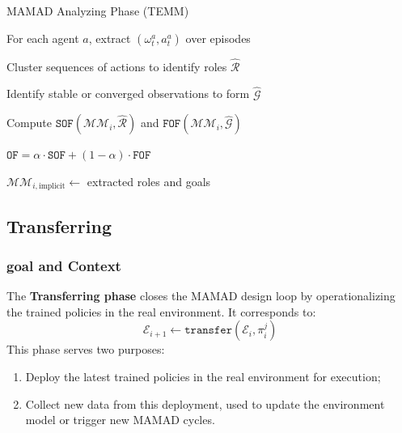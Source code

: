 \documentclass[pdflatex,sn-mathphys-num]{sn-jnl}%
\theoremstyle{thmstyleone}%
\theoremstyle{thmstyletwo}%
\theoremstyle{thmstylethree}%
\begin{document}
\begin{algorithm}[H]
    \caption{MAMAD Analyzing Phase (TEMM)}
    \label{alg:analyzing}
    \DontPrintSemicolon
    
    For each agent $a$, extract $(\omega_t^a, a_t^a)$ over episodes
    
    Cluster sequences of actions to identify roles $\hat{\mathcal{R}}$
    
    Identify stable or converged observations to form $\hat{\mathcal{G}}$
    
    Compute $\texttt{SOF}(\mathcal{MM}_i, \hat{\mathcal{R}})$ and $\texttt{FOF}(\mathcal{MM}_i, \hat{\mathcal{G}})$
    
    $\texttt{OF} = \alpha \cdot \texttt{SOF} + (1 - \alpha) \cdot \texttt{FOF}$
    
    $\mathcal{MM}_{i,\text{implicit}} \gets$ extracted roles and goals
    
\end{algorithm}


\subsection{Transferring}\label{sec:transferring}

\subsubsection*{goal and Context}

The \textbf{Transferring phase} closes the MAMAD design loop by operationalizing the trained policies in the real environment. It corresponds to:
\[
    \mathcal{E}_{i+1} \gets \texttt{transfer}(\mathcal{E}_i, \pi^j_i)
\]
This phase serves two purposes:
\begin{enumerate}
    \item Deploy the latest trained policies in the real environment for execution;
    \item Collect new data from this deployment, used to update the environment model or trigger new MAMAD cycles.
\end{enumerate}
\end{document}
